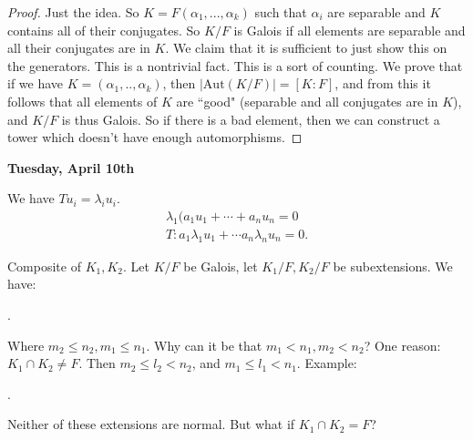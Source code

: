 \documentclass[9pt,reqno,twoside]{amsbook}
\theoremstyle{plain}
\numberwithin{section}{chapter}
\numberwithin{equation}{chapter}
\theoremstyle{definition}
\theoremstyle{remark}
\theoremstyle{plain}
\newcommand{\Q}{\mathbb{Q}}
\newcommand{\bee}{\begin{equation}\begin{aligned}}
\newcommand{\eee}{\end{aligned}\end{equation}}
\newcommand{\aut}{\mathrm{Aut}}
\renewcommand{\leq}{\leqslant}
\begin{document}
\begin{proof}
Just the idea. So $K = F(\alpha_1,...,\alpha_k)$  such that $\alpha_i$ are separable and $K$ contains all of their conjugates. So $K/F$ is Galois if all elements are separable and all their conjugates are in $K$. We claim that it is sufficient to just show this on the generators. This is a nontrivial fact. This is a sort of counting. We prove that if we have $K = (\alpha_1,..,\alpha_k)$, then $|\aut(K/F)| = [K:F]$, and from this it follows that all elements of $K$ are ``good" (separable and all conjugates are in $K$), and $K/F$ is thus Galois. So if there is a bad element, then we can construct a tower which doesn't have enough automorphisms. 
\end{proof}



\textbf{Tuesday, April 10th}

We have $Tu_i = \lambda_i u_i$. 
\bee
\lambda_1(a_1u_1 + \cdots + a_nu_n = 0\\
T:a_1\lambda_1u_1 + \cdots a_n\lambda_nu_n = 0.
\eee

Composite of $K_1,K_2$. Let $K/F$ be Galois, let $K_1/F,K_2/F$ be subextensions. We have:
\begin{center}
.
\end{center}
Where $m_2 \leq n_2,m_1\leq n_1$. Why can it be that $m_1 < n_1,m_2< n_2$? One reason: $K_1 \cap K_2 \neq F$. Then $m_2 \leq l_2 < n_2$, and $m_1 \leq l_1 < n_1$. Example:
\begin{center}
.
\end{center}
Neither of these extensions are normal. 
But what if $K_1 \cap K_2 = F$?
\end{document}
